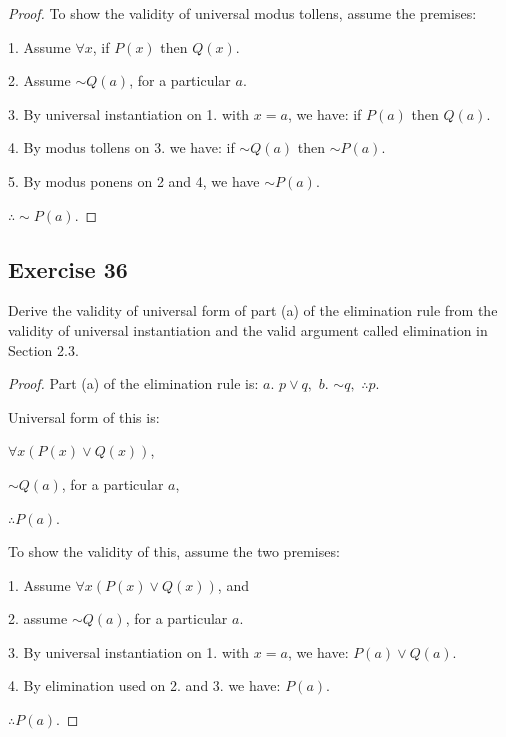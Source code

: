 \documentclass[14pt]{extarticle}
\newcommand{\fa}{\forall}
\begin{document}
\begin{proof}
To show the validity of universal modus tollens, assume the premises:

1. Assume $\fa x$, if $P(x)$ then $Q(x)$.

2. Assume $\sim Q(a)$, for a particular $a$.

3. By universal instantiation on 1. with $x = a$, we have: if $P(a)$ then $Q(a)$.

4. By modus tollens on 3. we have: if $\sim Q(a)$ then $\sim P(a)$.

5. By modus ponens on 2 and 4, we have $\sim P(a)$.

$\therefore \sim P(a)$.
\end{proof}

\subsection{Exercise 36}
Derive the validity of universal form of part (a) of the elimination rule from the validity of universal instantiation and the valid argument called elimination in Section 2.3.

\begin{proof}
Part (a) of the elimination rule is: $a. \,\, p \vee q, \,\, b.\,\, {\sim q}, \,\, \therefore p$.

Universal form of this is:

$\fa x (P(x) \vee Q(x))$,

$\sim Q(a)$, for a particular $a$,

$\therefore P(a)$.

To show the validity of this, assume the two premises:

1. Assume $\fa x (P(x) \vee Q(x))$, and

2. assume $\sim Q(a)$, for a particular $a$.

3. By universal instantiation on 1. with $x = a$, we have: $P(a) \vee Q(a)$.

4. By elimination used on 2. and 3. we have: $P(a)$.

$\therefore P(a)$.
\end{proof}
\end{document}
